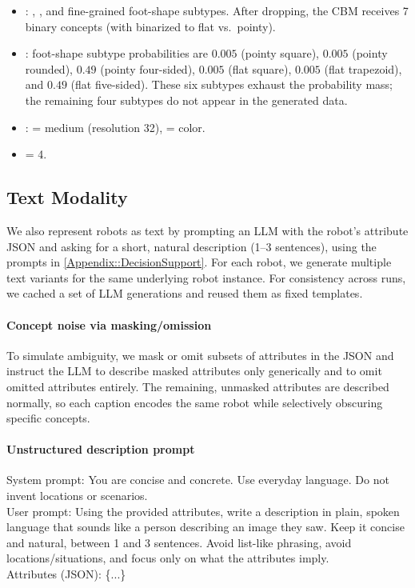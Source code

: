 \begin{itemize}
    \item {}: , , and fine-grained foot-shape subtypes. After dropping, the CBM receives 7 binary concepts (with  binarized to flat vs.\ pointy).
    \item {}: foot-shape subtype probabilities are $0.005$ (pointy square), $0.005$ (pointy rounded), $0.49$ (pointy four-sided), $0.005$ (flat square), $0.005$ (flat trapezoid), and $0.49$ (flat five-sided). These six subtypes exhaust the probability mass; the remaining four subtypes do not appear in the generated data.
    \item {}:  = medium (resolution 32),  = color.
    \item {} = 4.
\end{itemize}

\subsection{Text Modality}
We also represent robots as text by prompting an LLM with the robot's attribute JSON and asking for a short, natural description (1–3 sentences), using the prompts in \cref{Appendix::DecisionSupport}. For each robot, we generate multiple text variants for the same underlying robot instance. For consistency across runs, we cached a set of LLM generations and reused them as fixed templates.

\paragraph{Concept noise via masking/omission}
To simulate ambiguity, we mask or omit subsets of attributes in the JSON and instruct the LLM to describe masked attributes only generically and to omit omitted attributes entirely. The remaining, unmasked attributes are described normally, so each caption encodes the same robot while selectively obscuring specific concepts.


\paragraph{Unstructured description prompt}
\begin{center}
\begin{tcolorbox}[promptbox, listing only, listing options={basicstyle=\ttfamily\small,breaklines=true}]
System prompt: You are concise and concrete. Use everyday language. Do not invent
locations or scenarios. \\

User prompt: Using the provided attributes, write a description in plain, spoken
language that sounds like a person describing an image they saw. Keep it
concise and natural, between 1 and 3 sentences. Avoid list-like phrasing,
avoid locations/situations, and focus only on what the attributes imply. \\

Attributes (JSON): \{...\}
\end{tcolorbox}
\end{center}

